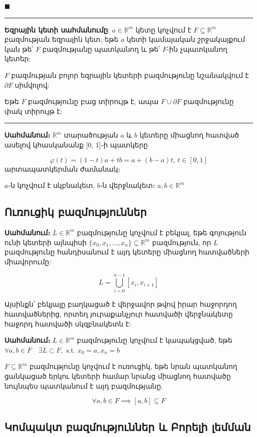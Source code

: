 \documentclass[12pt, a4paper]{article}
\begin{document}
$\blacksquare$

\vspace{1em}
\hrule
\vspace{1em}

\textbf{Եզրային կետի սահմանումը}: $a \in \mathbb{R}^m$ կետը կոչվում է $F \subseteq \mathbb{R}^m$ բազմության եզրային կետ, եթե $a$ կետի կամայական շրջակայքում կան թե՛ $F$ բազմությանը պատկանող և թե՛ $F$-ին չպատկանող կետեր:

$F$ բազմության բոլոր եզրային կետերի բազմությունը նշանակվում է $\partial F$ սիմվոլով:

Եթե $F$ բազմությունը բաց տիրույթ է, ապա $F \cup \partial F$ բազմությունը փակ տիրույթ է:

\vspace{1em}
\hrule
\vspace{1em}

\textbf{Սահմանում։}
$\mathbb{R}^m$ տարածության $a$ և $b$ կետերը միացնող հատված ասելով կհասկանանք [0, 1]֊ի պատկերը

$$\varphi(t)= (1-t)a + tb = a + (b-a)t, \ t \in [0, 1]$$
արտապատկերման ժամանակ։

$a$֊ն կոչվում է սկբնակետ, $b$֊ն վերջնակետ։ $a, b \in \mathbb{R}^m$

\subsection{Ուռուցիկ բազմություններ}

\textbf{Սահմանում։} $L \in \mathbb{R}^m$ բազմությունը կոչվում է բեկյալ, եթե գոյություն ունի կետերի այնպիսի $\{x_0, x_1, \dots, x_n\} \subseteq \mathbb{R}^m$ բազմություն, որ $L$ բազմությունը հանդիսանում է այդ կետերը միացնող հատվածների միավորումը:

$$L = \bigcup_{i=0}^{n-1} [x_i, x_{i+1}]$$

Այսինքն՝ բեկյալը բաղկացած է վերջավոր թվով իրար հաջորդող հատվածներից, որտեղ յուրաքանչյուր հատվածի վերջնակետը հաջորդ հատվածի սկզբնակետն է:

\textbf{Սահմանում։} $L \in \mathbb{R}^m$ բազմությունը կոչվում է կապակցված, եթե $\forall a, b \in F \quad \exists L \subset F, \text{  s.t.  }  x_0 = a, x_n = b$

$F \subseteq \mathbb{R}^m$ բազմությունը կոչվում է ուռուցիկ, եթե նրան պատկանող ցանկացած երկու կետերի համար նրանց միացնող հատվածը նույնպես պատկանում է այդ բազմությանը.

$$\forall a, b \in F \implies [a, b] \subseteq F$$

\subsection{Կոմպակտ բազմություններ և Բորելի լեմման}
\end{document}
